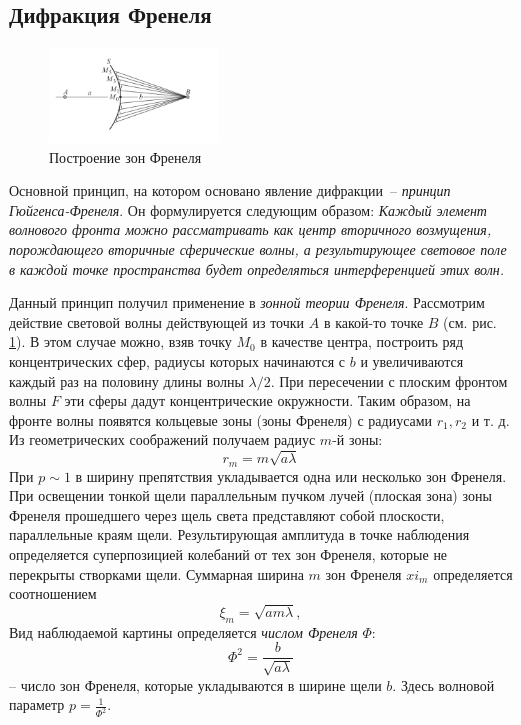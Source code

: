 \documentclass[a4paper,12pt]{article} %
\begin{document}
\subsection*{Дифракция Френеля}
\begin{figure}
  \begin{center}
    \includegraphics[width = 0.4\textwidth]{2.png}
  \end{center}
  \caption{Построение зон Френеля}
  \label{FrenellZones}
\end{figure}
Основной принцип, на котором основано явление дифракции~-- \textit{принцип Гюйгенса-Френеля}. Он формулируется следующим образом: \textit{Каждый элемент волнового фронта можно рассматривать как центр вторичного возмущения, порождающего вторичные сферические волны, а результирующее световое поле в каждой точке пространства будет определяться интерференцией этих волн.}

Данный принцип получил применение в \textit{зонной теории Френеля}. Рассмотрим действие световой волны действующей из точки $A$ в какой-то точке $B$ (см. рис. \ref{FrenellZones}). В этом случае можно, взяв точку $M_0$ в качестве центра, построить ряд концентрических сфер, радиусы которых начинаются с $b$ и увеличиваются каждый раз на половину длины волны $\lambda/2$. При пересечении с плоским фронтом волны $F$ эти сферы дадут концентрические окружности. Таким образом, на фронте волны появятся кольцевые зоны (зоны Френеля) с радиусами $r_1, r_2$ и т. д. Из геометрических соображений получаем радиус $m$-й зоны: 
\begin{equation}
r_m = m\sqrt{a\lambda}
\end{equation}
При $p\sim 1$ в ширину препятствия укладывается одна или несколько зон Френеля. При освещении тонкой щели параллельным пучком лучей (плоская зона) зоны Френеля прошедшего через щель света представляют собой плоскости, параллельные краям щели. Результирующая амплитуда в точке наблюдения определяется суперпозицией колебаний от тех зон Френеля, которые не перекрыты створками щели. Суммарная ширина $m$ зон Френеля $xi_m$ определяется соотношением
\begin{equation}
\xi_m = \sqrt{am\lambda},
\end{equation}
Вид наблюдаемой картины определяется \textit{числом Френеля} $\Phi$:
$$
\Phi^2 = \dfrac{b}{\sqrt{a\lambda}}
$$
-- число зон Френеля, которые укладываются в ширине щели $b$. Здесь волновой параметр $p = \frac{1}{\Phi^2}$.
\end{document}
